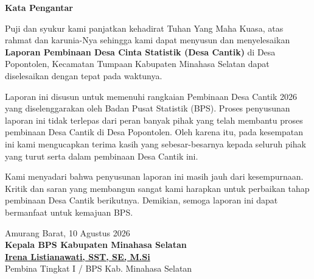 
\begin{center}
  {\Large \textbf{\textcolor{bpsnavy}{Kata Pengantar}}}
\end{center}
\vspace*{0.6cm}

Puji dan syukur kami panjatkan kehadirat Tuhan Yang Maha Kuasa, atas rahmat dan karunia-Nya sehingga kami dapat menyusun dan menyelesaikan \textbf{Laporan Pembinaan Desa Cinta Statistik (Desa Cantik)} di Desa Popontolen, Kecamatan Tumpaan Kabupaten Minahasa Selatan dapat diselesaikan dengan tepat pada waktunya.

Laporan ini disusun untuk memenuhi rangkaian Pembinaan Desa Cantik 2026 yang diselenggarakan oleh Badan Pusat Statistik (BPS). Proses penyusunan laporan ini tidak terlepas dari peran banyak pihak yang telah membantu proses pembinaan Desa Cantik di Desa Popontolen. Oleh karena itu, pada kesempatan ini kami mengucapkan terima kasih yang sebesar-besarnya kepada seluruh pihak yang turut serta dalam pembinaan Desa Cantik ini.

Kami menyadari bahwa penyusunan laporan ini masih jauh dari kesempurnaan. Kritik dan saran yang membangun sangat kami harapkan untuk perbaikan tahap pembinaan Desa Cantik berikutnya. Demikian, semoga laporan ini dapat bermanfaat untuk kemajuan BPS.

\vspace*{1.5cm}
\begin{flushright}
  \begin{minipage}{0.58\textwidth}
    \centering
    Amurang Barat, 10 Agustus 2026\\[0.1cm]
    \textbf{\textcolor{bpsnavy}{Kepala BPS Kabupaten Minahasa Selatan}}\\[2.5cm]
    \textbf{\underline{\textcolor{bpsdark}{Irena Listianawati, SST, SE, M.Si}}}\\[0.1cm]
    \textcolor{gray!80}{\footnotesize Pembina Tingkat I / BPS Kab. Minahasa Selatan}
  \end{minipage}
\end{flushright}
